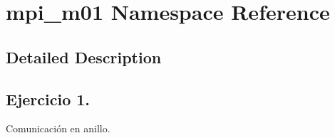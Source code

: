 \hypertarget{namespacempi__m01}{\section{mpi\-\_\-m01 Namespace Reference}
\label{namespacempi__m01}
}


\subsection{Detailed Description}
\subsection*{Ejercicio 1.}

Comunicación en anillo. 